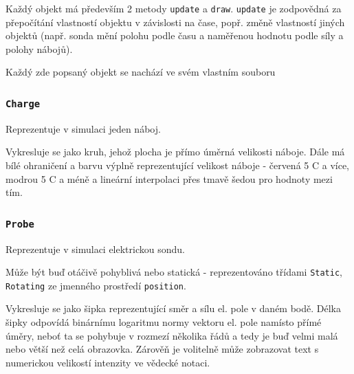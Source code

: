 \documentclass[12pt]{article}
\newcommand{\code}[1]{\mbox{\texttt{#1}}}
\begin{document}
Každý objekt má především 2 metody \code{update} a \code{draw}. \code{update} je
zodpovědná za přepočítání vlastností objektu v závislosti na čase, popř. změně
vlastností jiných objektů (např. sonda mění polohu podle času a naměřenou
hodnotu podle síly a polohy nábojů).

Každý zde popsaný objekt se nachází ve svém vlastním souboru

\subsubsection{\code{Charge}}

Reprezentuje v simulaci jeden náboj. 


Vykresluje se jako kruh, jehož plocha je přímo úměrná velikosti náboje. Dále má
bílé ohraničení a barvu výplně reprezentující velikost náboje - červená 5 C a více,
modrou 5 C a méně a lineární interpolaci přes tmavě šedou pro hodnoty mezi tím.

\subsubsection{\code{Probe}}

Reprezentuje v simulaci elektrickou sondu.

Může být buď otáčivě pohyblivá nebo statická 
- reprezentováno třídami \code{Static}, \code{Rotating} ze jmenného prostředí
\code{position}.

Vykresluje se jako šipka reprezentující směr a sílu el. pole v daném bodě.
Délka šipky odpovídá binárnímu logaritmu normy vektoru el. pole namísto přímé
úměry, neboť ta se pohybuje v rozmezí několika řádů a tedy je buď velmi malá
nebo větší než celá obrazovka. Zárověň je volitelně může zobrazovat text s
numerickou velikostí intenzity ve vědecké notaci.

%
%
%
\end{document}
